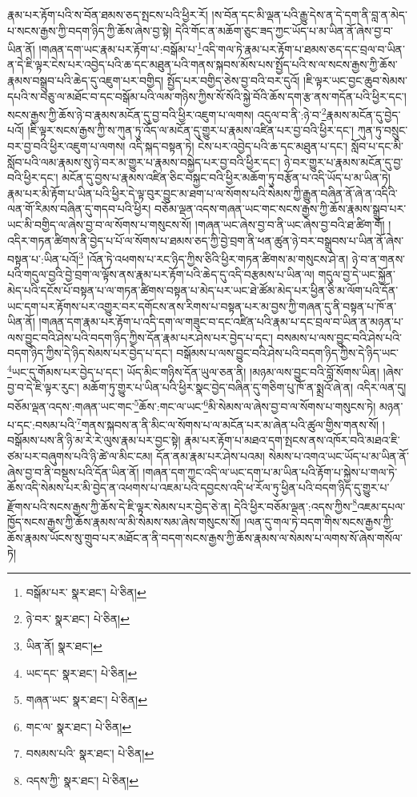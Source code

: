 རྣམ་པར་རྟོག་པའི་ས་བོན་ཐམས་ཅད་སྤངས་པའི་ཕྱིར་རོ། །ས་བོན་དང་མི་ལྡན་པའི་རྒྱུ་དེས་ན་དེ་དག་ནི་བླ་ན་མེད་པ་སངས་རྒྱས་ཀྱི་བདག་ཉིད་ཀྱི་ཆོས་ཞེས་བྱ་སྟེ། དེའི་གོང་ན་མཆོག་ཅུང་ཟད་ཀྱང་ཡོད་པ་མ་ཡིན་ནོ་ཞེས་བྱ་བ་ཡིན་ནོ། །གཞན་དག་ཡང་རྣམ་པར་རྟོག་པ་:བསྒོམ་པ་\footnote{བསྒོམ་པར་  སྣར་ཐང་།  པེ་ཅིན། }འདི་གལ་ཏེ་རྣམ་པར་རྟོག་པ་ཐམས་ཅད་དང་བྲལ་བ་ཡིན་ན་དེ་ཇི་ལྟར་ངེས་པར་འབྱེད་པའི་ཆ་དང་མཐུན་པའི་གནས་སྐབས་མོས་པས་སྤྱོད་པའི་ས་ལ་སངས་རྒྱས་ཀྱི་ཆོས་རྣམས་བསྒྲུབ་པའི་ཆེད་དུ་འཇུག་པར་བགྱིད། སྤྱོད་པར་བགྱིད་ཅེས་བྱ་བའི་བར་དུའོ། །ཇི་ལྟར་ཡང་བྱང་ཆུབ་སེམས་དཔའི་ས་བཅུ་ལ་མཐོང་བ་དང་བསྒོམ་པའི་ལམ་གཉིས་ཀྱིས་སོ་སོའི་སྐྱེ་བོའི་ཆོས་དག་རྩ་ནས་གདོན་པའི་ཕྱིར་དང་། སངས་རྒྱས་ཀྱི་ཆོས་ཉེ་བ་རྣམས་མངོན་དུ་བྱ་བའི་ཕྱིར་འཇུག་པ་ལགས། འདུལ་བ་ནི་:ཉེ་བ་\footnote{ཉེ་བར་  སྣར་ཐང་།  པེ་ཅིན། }རྣམས་མངོན་དུ་བྱེད་པའོ། །ཇི་ལྟར་སངས་རྒྱས་ཀྱི་ས་ཀུན་ཏུ་འོད་ལ་མངོན་དུ་གྱུར་པ་རྣམས་འཛིན་པར་བྱ་བའི་ཕྱིར་དང་། ཀུན་ཏུ་བསྲུང་བར་བྱ་བའི་ཕྱིར་འཇུག་པ་ལགས། འདི་སྐད་བསྟན་ཏེ། ངེས་པར་འབྱེད་པའི་ཆ་དང་མཐུན་པ་དང་། སློབ་པ་དང་མི་སློབ་པའི་ལམ་རྣམས་སུ་ཉེ་བར་མ་གྱུར་པ་རྣམས་བསྐྱེད་པར་བྱ་བའི་ཕྱིར་དང་། ཉེ་བར་གྱུར་པ་རྣམས་མངོན་དུ་བྱ་བའི་ཕྱིར་དང་། མངོན་དུ་བྱས་པ་རྣམས་འཛིན་ཅིང་བསྐྱང་བའི་ཕྱིར་མཆོག་ཏུ་བརྩོན་པ་འདི་ཡོད་པ་མ་ཡིན་ཏེ། རྣམ་པར་མི་རྟོག་པ་ཡིན་པའི་ཕྱིར་དེ་ལྟ་བུར་བྱུང་མ་ཐག་པ་ལ་སོགས་པའི་སེམས་ཀྱི་རྒྱུན་བཞིན་ནོ་ཞེ་ན་འདིའི་ལན་གོ་རིམས་བཞིན་དུ་གདབ་པའི་ཕྱིར། བཅོམ་ལྡན་འདས་གཞན་ཡང་གང་སངས་རྒྱས་ཀྱི་ཆོས་རྣམས་སྒྲུབ་པར་ཡང་མི་བགྱིད་ལ་ཞེས་བྱ་བ་ལ་སོགས་པ་གསུངས་སོ། །གཞན་ཡང་ཞེས་བྱ་བ་ནི་ཡང་ཞེས་བྱ་བའི་ཐ་ཚིག་གོ། །འདིར་གཏན་ཚིགས་ནི་བྱེད་པ་པོ་ལ་སོགས་པ་ཐམས་ཅད་ཀྱི་བྱེ་བྲག་ནི་ཕན་ཚུན་ཉེ་བར་བསྒྲུབས་པ་ཡིན་ནོ་ཞེས་བསྟན་པ་:ཡིན་པའོ།\footnote{ཡིན་ནོ།  སྣར་ཐང་། } །འོན་ཏེ་འཕགས་པ་རང་ཉིད་ཀྱིས་ཅིའི་ཕྱིར་གཏན་ཚིགས་མ་གསུངས་ཤེ་ན། ཉེ་བ་ན་གནས་པའི་གདུལ་བྱའི་བྱེ་བྲག་ལ་ལྟོས་ནས་རྣམ་པར་རྟོག་པའི་ཆེད་དུ་འདི་བརྩམས་པ་ཡིན་ལ། གདུལ་བྱ་དེ་ཡང་སྐྱོན་མེད་པའི་དངོས་པོ་བསྟན་པ་ལ་གཏན་ཚིགས་བསྟན་པ་མེད་པར་ཡང་ཐེ་ཚོམ་མེད་པར་ཕྱིན་ཅི་མ་ལོག་པའི་དོན་ཡང་དག་པར་རྟོགས་པར་འགྱུར་བར་དགོངས་ནས་རིགས་པ་བསྟན་པར་མ་བྱས་ཀྱི་གཞན་དུ་ནི་བསྟན་པ་ཁོ་ན་ཡིན་ནོ། །གཞན་དག་རྣམ་པར་རྟོག་པ་འདི་དག་ལ་གཟུང་བ་དང་འཛིན་པའི་རྣམ་པ་དང་བྲལ་བ་ཡིན་ན་མཉན་པ་ལས་བྱུང་བའི་ཤེས་པའི་བདག་ཉིད་ཀྱིས་དོན་རྣམ་པར་ཤེས་པར་བྱེད་པ་དང་། བསམས་པ་ལས་བྱུང་བའི་ཤེས་པའི་བདག་ཉིད་ཀྱིས་དེ་ཉིད་སེམས་པར་བྱེད་པ་དང་། བསྒོམས་པ་ལས་བྱུང་བའི་ཤེས་པའི་བདག་ཉིད་ཀྱིས་དེ་ཉིད་ཡང་\footnote{ཡང་དང་  སྣར་ཐང་།  པེ་ཅིན། }ཡང་དུ་གོམས་པར་བྱེད་པ་དང་། ཡོད་མིང་གཉིས་དོན་ཡུལ་ཅན་ནི། །མཉམ་ལས་བྱུང་བའི་བློ་སོགས་ཡིན། །ཞེས་བྱ་བ་དེ་ཇི་ལྟར་རུང་། མཆོག་ཏུ་གྱུར་པ་ཡིན་པའི་ཕྱིར་སྣང་བྱེད་བཞིན་དུ་གཅིག་པུ་ཁོ་ན་སྨྲའོ་ཞེ་ན། འདིར་ལན་དུ། བཅོམ་ལྡན་འདས་:གཞན་ཡང་གང་\footnote{གཞན་ཡང་  སྣར་ཐང་།  པེ་ཅིན། }ཆོས་:གང་ལ་ཡང་\footnote{གང་ལ་  སྣར་ཐང་།  པེ་ཅིན། }མི་སེམས་ལ་ཞེས་བྱ་བ་ལ་སོགས་པ་གསུངས་ཏེ། མཉན་པ་དང་:བསམ་པའི་\footnote{བསམས་པའི་  སྣར་ཐང་།  པེ་ཅིན། }གནས་སྐབས་ན་ནི་མིང་ལ་སོགས་པ་ལ་མངོན་པར་མ་ཞེན་པའི་ཚུལ་གྱིས་གནས་སོ། །བསྒོམས་པས་ནི་ཉི་མ་རེ་རེ་ལུས་རྣམ་པར་བྱང་སྟེ། རྣམ་པར་རྟོག་པ་མཐའ་དག་སྤངས་ནས་འཁོར་བའི་མཐའ་ཇི་ཙམ་པར་བཞུགས་པའི་ཉི་ཚེ་ལ་མིང་ངམ། དོན་ནམ་རྣམ་པར་ཤེས་པའམ། སེམས་པ་འགའ་ཡང་ཡོད་པ་མ་ཡིན་ནོ་ཞེས་བྱ་བ་ནི་བསྡུས་པའི་དོན་ཡིན་ནོ། །གཞན་དག་ཀྱང་འདི་ལ་ཡང་དག་པ་མ་ཡིན་པའི་རྟོག་པ་སྐྱེས་པ་གལ་ཏེ་ཆོས་འདི་སེམས་པར་མི་བྱེད་ན་འཕགས་པ་འཇམ་པའི་དབྱངས་འདི་ཕ་རོལ་ཏུ་ཕྱིན་པའི་བདག་ཉིད་དུ་གྱུར་པ་རྫོགས་པའི་སངས་རྒྱས་ཀྱི་ཆོས་དེ་ཇི་ལྟར་སེམས་པར་བྱེད་ཅེ་ན། དེའི་ཕྱིར་བཅོམ་ལྡན་:འདས་ཀྱིས་\footnote{འདས་ཀྱི་  སྣར་ཐང་།  པེ་ཅིན། }འཇམ་དཔལ་ཁྱོད་སངས་རྒྱས་ཀྱི་ཆོས་རྣམས་ལ་མི་སེམས་སམ་ཞེས་གསུངས་སོ། །ལན་དུ་གལ་ཏེ་བདག་གིས་སངས་རྒྱས་ཀྱི་ཆོས་རྣམས་ཡོངས་སུ་གྲུབ་པར་མཐོང་ན་ནི་བདག་སངས་རྒྱས་ཀྱི་ཆོས་རྣམས་ལ་སེམས་པ་ལགས་སོ་ཞེས་གསོལ་ཏེ། 